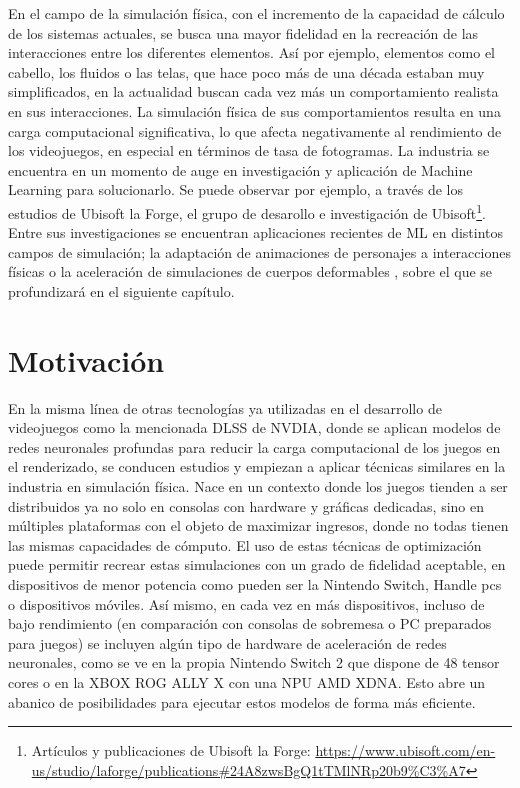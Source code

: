 En el campo de la simulación física, con el incremento de la capacidad de cálculo de los sistemas actuales, se busca una mayor fidelidad en la recreación de las interacciones entre los diferentes elementos. Así por ejemplo, elementos como el cabello, los fluidos o las telas, que hace poco más de una década estaban muy simplificados, en la actualidad buscan cada vez más un comportamiento realista en sus interacciones. La simulación física de sus comportamientos resulta en una carga computacional significativa, lo que afecta negativamente al rendimiento de los videojuegos, en especial en términos de tasa de fotogramas. La industria se encuentra en un momento de auge en investigación y aplicación de Machine Learning para solucionarlo. Se puede observar por ejemplo, a través de los estudios de Ubisoft la Forge, el grupo de desarollo e investigación de Ubisoft\footnote{Artículos y publicaciones de Ubisoft la Forge: \url{https://www.ubisoft.com/en-us/studio/laforge/publications\#24A8zwsBgQ1tTMlNRp20b9\%C3\%A7}}. Entre sus investigaciones se encuentran aplicaciones recientes de ML en distintos campos de simulación; la adaptación de animaciones de personajes a interacciones físicas \cite{drecon2019} o la aceleración de simulaciones de cuerpos deformables \cite{holden_subspace_2019}, sobre el que se profundizará en el siguiente capítulo. \newline



\section{Motivación}
En la misma línea de otras tecnologías ya utilizadas en el desarrollo de videojuegos como la mencionada DLSS de NVDIA, donde se aplican modelos de redes neuronales profundas para reducir la carga computacional de los juegos en el renderizado, se conducen estudios y empiezan a aplicar técnicas similares en la industria en simulación física. Nace en un contexto donde los juegos tienden a ser distribuidos ya no solo en consolas con hardware y gráficas dedicadas, sino en múltiples plataformas con el objeto de maximizar ingresos, donde no todas tienen las mismas capacidades de cómputo.  El uso de estas técnicas de optimización puede permitir recrear estas simulaciones con un grado de fidelidad aceptable, en dispositivos de menor potencia como pueden ser la Nintendo Switch, Handle pcs o dispositivos móviles. Así mismo, en cada vez en más dispositivos, incluso de bajo rendimiento (en comparación con consolas de sobremesa o PC preparados para juegos) se incluyen algún tipo de hardware de aceleración de redes neuronales, como se ve en la propia Nintendo Switch 2 que dispone de 48 tensor cores o en la XBOX ROG ALLY X con una NPU AMD XDNA. Esto abre un abanico de posibilidades para ejecutar estos modelos de forma más eficiente.\newline

